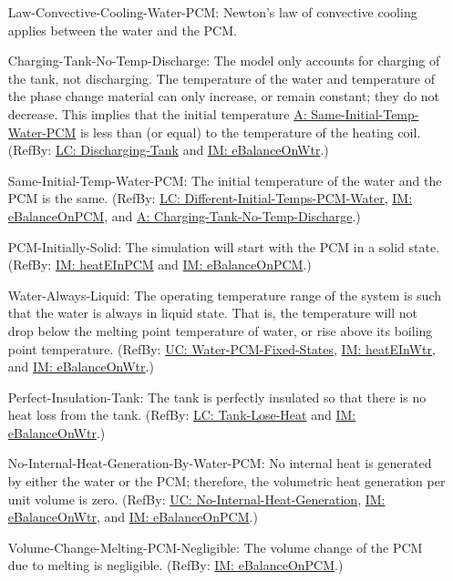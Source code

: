 \documentclass[12pt]{article}
\begin{document}
\begin{itemize}
\item[Law-Convective-Cooling-Water-PCM:\phantomsection\label{assumpLCCWP}]{Newton's law of convective cooling applies between the water and the PCM.}
\item[Charging-Tank-No-Temp-Discharge:\phantomsection\label{assumpCTNOD}]{The model only accounts for charging of the tank, not discharging. The temperature of the water and temperature of the phase change material can only increase, or remain constant; they do not decrease. This implies that the initial temperature \hyperref[assumpSITWP]{A: Same-Initial-Temp-Water-PCM} is less than (or equal) to the temperature of the heating coil. (RefBy: \hyperref[likeChgDT]{LC: Discharging-Tank} and \hyperref[IM:eBalanceOnWtr]{IM: eBalanceOnWtr}.)}
\item[Same-Initial-Temp-Water-PCM:\phantomsection\label{assumpSITWP}]{The initial temperature of the water and the PCM is the same. (RefBy: \hyperref[likeChgDITPW]{LC: Different-Initial-Temps-PCM-Water}, \hyperref[IM:eBalanceOnPCM]{IM: eBalanceOnPCM}, and \hyperref[assumpCTNOD]{A: Charging-Tank-No-Temp-Discharge}.)}
\item[PCM-Initially-Solid:\phantomsection\label{assumpPIS}]{The simulation will start with the PCM in a solid state. (RefBy: \hyperref[IM:heatEInPCM]{IM: heatEInPCM} and \hyperref[IM:eBalanceOnPCM]{IM: eBalanceOnPCM}.)}
\item[Water-Always-Liquid:\phantomsection\label{assumpWAL}]{The operating temperature range of the system is such that the water is always in liquid state. That is, the temperature will not drop below the melting point temperature of water, or rise above its boiling point temperature. (RefBy: \hyperref[unlikeChgWPFS]{UC: Water-PCM-Fixed-States}, \hyperref[IM:heatEInWtr]{IM: heatEInWtr}, and \hyperref[IM:eBalanceOnWtr]{IM: eBalanceOnWtr}.)}
\item[Perfect-Insulation-Tank:\phantomsection\label{assumpPIT}]{The tank is perfectly insulated so that there is no heat loss from the tank. (RefBy: \hyperref[likeChgTLH]{LC: Tank-Lose-Heat} and \hyperref[IM:eBalanceOnWtr]{IM: eBalanceOnWtr}.)}
\item[No-Internal-Heat-Generation-By-Water-PCM:\phantomsection\label{assumpNIHGBWP}]{No internal heat is generated by either the water or the PCM; therefore, the volumetric heat generation per unit volume is zero. (RefBy: \hyperref[unlikeChgNIHG]{UC: No-Internal-Heat-Generation}, \hyperref[IM:eBalanceOnWtr]{IM: eBalanceOnWtr}, and \hyperref[IM:eBalanceOnPCM]{IM: eBalanceOnPCM}.)}
\item[Volume-Change-Melting-PCM-Negligible:\phantomsection\label{assumpVCMPN}]{The volume change of the PCM due to melting is negligible. (RefBy: \hyperref[IM:eBalanceOnPCM]{IM: eBalanceOnPCM}.)}

\end{itemize}
\end{document}
